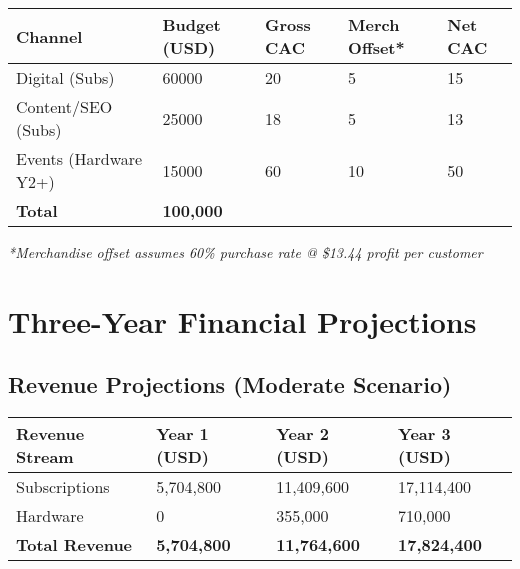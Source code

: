 \documentclass[11pt]{article}
\newcommand{\merchAvgProfit}{13.44}
\newcommand{\merchAttachRate}{60}
\newcommand{\cacDigital}{20}
\newcommand{\cacContent}{18}
\newcommand{\cacEvents}{60}
\newcommand{\merchOffsetSubs}{5}
\newcommand{\merchOffsetHw}{10}
\newcommand{\budgetDigital}{60000}
\newcommand{\budgetContent}{25000}
\newcommand{\budgetEvents}{15000}
\begin{document}
\begin{table}[H]
\centering
\begin{tabularx}{\linewidth}{l Y Y Y Y}
\toprule
Channel & Budget (USD) & Gross CAC\cite{authoranalysis2024} & Merch Offset* & Net CAC \\\midrule
Digital (Subs) & \budgetDigital & \cacDigital & \merchOffsetSubs & 15 \\
Content/SEO (Subs) & \budgetContent & \cacContent & \merchOffsetSubs & 13 \\
Events (Hardware Y2+) & \budgetEvents & \cacEvents & \merchOffsetHw & 50 \\\midrule
\textbf{Total} & \textbf{100,000} &  &  &  \\
\bottomrule
\end{tabularx}
\end{table}
\textit{*Merchandise offset assumes \merchAttachRate\% purchase rate @ \$\merchAvgProfit{} profit per customer}

\section{Three-Year Financial Projections}

\subsection{Revenue Projections (Moderate Scenario)}
\begin{table}[H]
\centering
\begin{tabularx}{\linewidth}{l Y Y Y}
\toprule
Revenue Stream & Year 1 (USD) & Year 2 (USD) & Year 3 (USD) \\\midrule
Subscriptions & 5,704,800 & 11,409,600 & 17,114,400 \\
Hardware & 0 & 355,000 & 710,000 \\\midrule
\textbf{Total Revenue} & \textbf{5,704,800} & \textbf{11,764,600} & \textbf{17,824,400} \\
\bottomrule
\end{tabularx}
\end{table}
\end{document}
